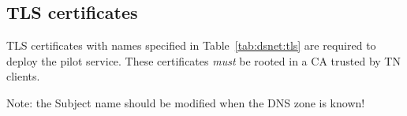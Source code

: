 \documentclass[10pt,a4paper]{article}
\begin{document}
\subsection{TLS certificates}

TLS certificates with names specified in Table~\ref{tab:dsnet:tls} are required to deploy the pilot service.
These certificates \emph{must} be rooted in a CA trusted by TN clients.

Note: the Subject name should be modified when the DNS zone is known!

\end{document}
